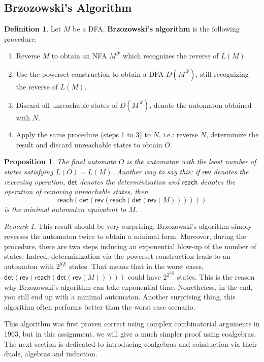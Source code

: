 \documentclass{article}
\newtheorem{prop}[thm]{Proposition}
\theoremstyle{definition}
\newtheorem{defn}[thm]{Definition}
\theoremstyle{remark}
\newtheorem{rem}[thm]{Remark}
\begin{document}
\subsection{Brzozowski's Algorithm}\label{sec-brzozowski}
\begin{defn}\label{defn-brzozowski}
    Let $M$ be a DFA, \textbf{Brzozowski's algorithm} is the following procedure.
    \begin{enumerate}
        \item Reverse $M$ to obtain an NFA $M^{\mathcal{R}}$ which recognizes the reverse of $L(M)$.
        \item Use the powerset construction to obtain a DFA $D(M^{\mathcal{R}})$, still recognizing the reverse of $L(M)$.
        \item Discard all unreachable states of $D(M^{\mathcal{R}})$, denote the automaton obtained with $N$.
        \item Apply the same procedure (steps 1 to 3) to $N$, i.e.: reverse $N$, determinize the result and discard unreachable states to obtain $O$. 
    \end{enumerate}
\end{defn}
\begin{prop}
    The final automata $O$ is the automaton with the least number of states satisfying $L(O) = L(M)$. Another way to say this: if $\textsf{rev}$ denotes the reversing operation, $\textsf{det}$ denotes the determinization and $\textsf{reach}$ denotes the operation of removing unreachable states, then \[\textsf{reach}(\textsf{det}(\textsf{rev}(\textsf{reach}(\textsf{det}(\textsf{rev}(M))))))\] is the minimal automaton equivalent to $M$.
\end{prop}
\begin{rem}
    This result should be very surprising. Brzozowski's algorithm simply reverses the automaton twice to obtain a minimal form. Moreover, during the procedure, there are two steps inducing an exponential blow-up of the number of states. Indeed, determinization via the powerset construction leads to an automaton with $2^{|Q|}$ states. That means that in the worst cases, $\textsf{det}(\textsf{rev}(\textsf{reach}(\textsf{det}(\textsf{rev}(M)))))$ could have $2^{2^{|Q|}}$ states. This is the reason why Brzozowski's algorithm can take exponential time. Nonetheless, in the end, you still end up with a minimal automaton. Another surprising thing, this algorithm often performs better than the worst case scenario.
\end{rem}
This algorithm was first proven correct using complex combinatorial arguments in 1963, but in this assignment, we will give a much simpler proof using coalgebras. The next section is dedicated to introducing coalgebras and coinduction via their duals, algebras and induction.
\end{document}
